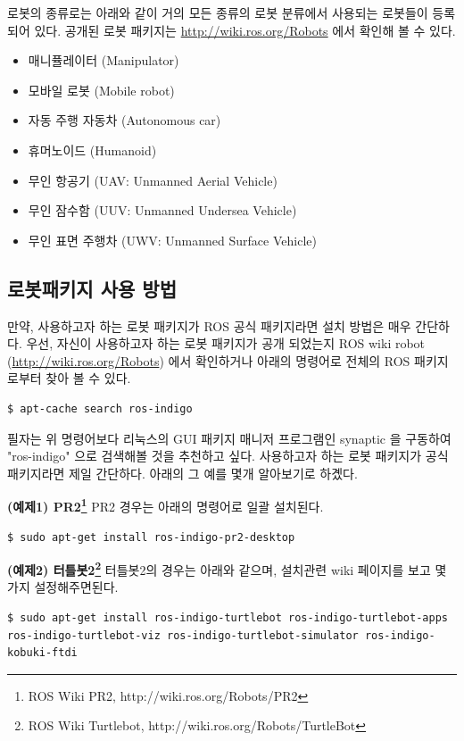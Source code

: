 로봇의 종류로는 아래와 같이 거의 모든 종류의 로봇 분류에서 사용되는 로봇들이 등록되어 있다. 공개된 로봇 패키지는 \url{http://wiki.ros.org/Robots} 에서 확인해 볼 수 있다.

\begin{itemize}[leftmargin=*]
\item 매니퓰레이터 (Manipulator)
\item 모바일 로봇 (Mobile robot)
\item 자동 주행 자동차 (Autonomous car)
\item 휴머노이드 (Humanoid)
\item 무인 항공기 (UAV: Unmanned Aerial Vehicle)
\item 무인 잠수함 (UUV: Unmanned Undersea Vehicle)
\item 무인 표면 주행차 (UWV: Unmanned Surface Vehicle) 
\end{itemize}



\subsection{로봇패키지 사용 방법}

만약, 사용하고자 하는 로봇 패키지가 ROS 공식 패키지라면 설치 방법은 매우 간단하다. 우선, 자신이 사용하고자 하는 로봇 패키지가 공개 되었는지 ROS wiki robot (\url{http://wiki.ros.org/Robots}) 에서 확인하거나 아래의 명령어로 전체의 ROS 패키지로부터 찾아 볼 수 있다.

\begin{lstlisting}[language=ROS]
$ apt-cache search ros-indigo
\end{lstlisting}

필자는 위 명령어보다 리눅스의 GUI 패키지 매니저 프로그램인 synaptic 을 구동하여  "ros-indigo" 으로 검색해볼 것을 추천하고 싶다. 사용하고자 하는 로봇 패키지가 공식 패키지라면 제일 간단하다. 아래의 그 예를 몇개 알아보기로 하곘다.

\vspace{\baselineskip}
\textbf{(예제1) PR2\footnote{ROS Wiki PR2, http://wiki.ros.org/Robots/PR2}}
PR2 경우는 아래의 명령어로 일괄 설치된다.
\begin{lstlisting}[language=ROS]
$ sudo apt-get install ros-indigo-pr2-desktop
\end{lstlisting}

\textbf{(예제2) 터틀봇2\footnote{ROS Wiki Turtlebot, http://wiki.ros.org/Robots/TurtleBot}}
터틀봇2의 경우는 아래와 같으며, 설치관련 wiki 페이지를 보고 몇가지 설정해주면된다.
\begin{lstlisting}[language=ROS]
$ sudo apt-get install ros-indigo-turtlebot ros-indigo-turtlebot-apps ros-indigo-turtlebot-viz ros-indigo-turtlebot-simulator ros-indigo-kobuki-ftdi
\end{lstlisting}

